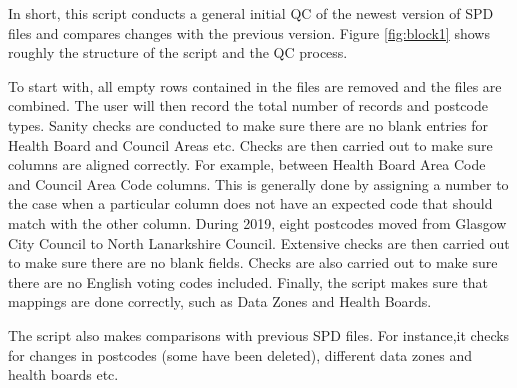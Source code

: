 \documentclass[12pt]{article}
\begin{document}
In short, this script conducts a general initial
QC of the newest version of SPD files and compares
changes with the previous version. Figure \ref{fig:block1}
shows roughly the structure of the script and the QC process.

To start with, all empty rows contained in the files
are removed and the files are combined. The user will then
record the total number of records and postcode types.
Sanity checks are conducted to make sure there are
no blank entries for Health Board and Council Areas etc.
Checks are then carried out to make sure columns are
aligned correctly. For example, between Health Board Area
Code and Council Area Code columns. This is generally done
by assigning a number to the case when a particular
column does not have an expected code that should match
with the other column. 
During 2019, eight postcodes moved from Glasgow City Council to
North Lanarkshire Council. Extensive checks are then carried
out to make sure there are no blank fields. Checks are also
carried out to make sure there are no English voting codes included.
Finally, the script makes sure that mappings are done correctly,
such as Data Zones and Health Boards.

The script also makes comparisons with previous SPD files.
For instance,it checks for changes in postcodes
(some have been deleted), different data zones and
health boards etc.
\end{document}
